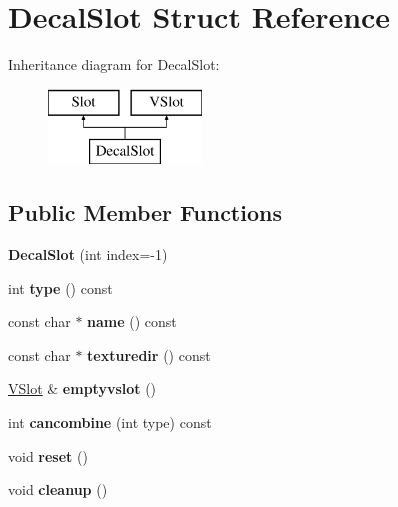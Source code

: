 \hypertarget{struct_decal_slot}{}\section{Decal\+Slot Struct Reference}
\label{struct_decal_slot}
Inheritance diagram for Decal\+Slot\+:\begin{figure}[H]
\begin{center}
\leavevmode
\includegraphics[height=2.000000cm]{struct_decal_slot}
\end{center}
\end{figure}
\subsection*{Public Member Functions}
\begin{DoxyCompactItemize}
\item 
\mbox{\label{struct_decal_slot_a4f98aeb399d93efdec0d893392d8e63a}} 
{\bfseries Decal\+Slot} (int index=-\/1)
\item 
\mbox{\label{struct_decal_slot_abc8bf0b184e24ece3de462535ad231be}} 
int {\bfseries type} () const
\item 
\mbox{\label{struct_decal_slot_a2ce63e7f3051d55cdbf22ac8a3446d40}} 
const char $\ast$ {\bfseries name} () const
\item 
\mbox{\label{struct_decal_slot_a11e475fa849bf5d8924ae5c72854dde5}} 
const char $\ast$ {\bfseries texturedir} () const
\item 
\mbox{\label{struct_decal_slot_a5d8d7d95178c1b97d4d2ca5279903f3b}} 
\hyperlink{struct_v_slot}{V\+Slot} \& {\bfseries emptyvslot} ()
\item 
\mbox{\label{struct_decal_slot_a3c54bf7eb96a111234bccf6cfe2fb9c7}} 
int {\bfseries cancombine} (int type) const
\item 
\mbox{\label{struct_decal_slot_ac3be8a44ef390b993b41c565e3d893d5}} 
void {\bfseries reset} ()
\item 
\mbox{\label{struct_decal_slot_a89938de20425aa8768096539d872c7ec}} 
void {\bfseries cleanup} ()
\end{DoxyCompactItemize}
